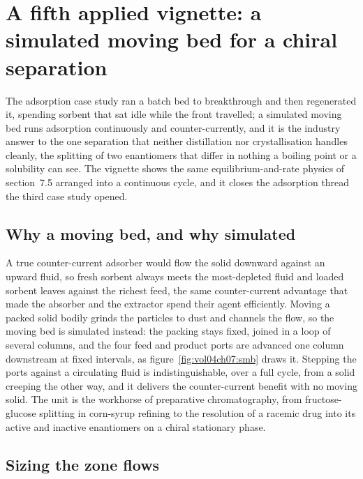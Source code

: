 \section{A fifth applied vignette: a simulated moving bed for a chiral
separation}

The adsorption case study ran a batch bed to breakthrough and then regenerated
it, spending sorbent that sat idle while the front travelled; a simulated moving
bed runs adsorption continuously and counter-currently, and it is the industry
answer to the one separation that neither distillation nor crystallisation
handles cleanly, the splitting of two enantiomers that differ in nothing a
boiling point or a solubility can see. The vignette shows the same
equilibrium-and-rate physics of section~7.5 arranged into a continuous cycle,
and it closes the adsorption thread the third case study opened.

\subsection*{Why a moving bed, and why simulated}

A true counter-current adsorber would flow the solid downward against an upward
fluid, so fresh sorbent always meets the most-depleted fluid and loaded sorbent
leaves against the richest feed, the same counter-current advantage that made
the absorber and the extractor spend their agent efficiently. Moving a packed
solid bodily grinds the particles to dust and channels the flow, so the moving
bed is simulated instead: the packing stays fixed, joined in a loop of several
columns, and the four feed and product ports are advanced one column downstream
at fixed intervals, as figure~\ref{fig:vol04ch07:smb} draws it. Stepping the
ports against a circulating fluid is indistinguishable, over a full cycle, from
a solid creeping the other way, and it delivers the counter-current benefit with
no moving solid. The unit is the workhorse of preparative chromatography, from
fructose-glucose splitting in corn-syrup refining to the resolution of a
racemic drug into its active and inactive enantiomers on a chiral stationary
phase.



\subsection*{Sizing the zone flows}

